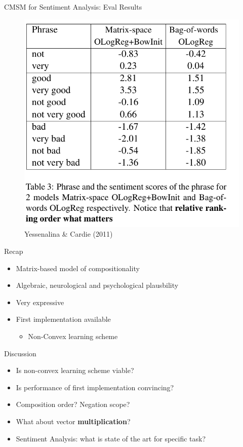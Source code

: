 \documentclass[12pt,a4paper]{beamer}
\begin{document}
\begin{frame}{CMSM for Sentiment Analysis: Eval Results}
\begin{figure}
\includegraphics[scale=0.45]{cmsm_for_se_table3.png}
\caption{Yessenalina \&  Cardie (2011)}
\end{figure}

\end{frame}


\begin{frame}{Recap}
\begin{itemize}
\item Matrix-based model of compositionality
\item Algebraic, neurological and psychological plausbility
\item Very expressive
\item First implementation available
    \begin{itemize}
    \item Non-Convex learning scheme
    \end{itemize}
\end{itemize}
\end{frame}

\begin{frame}{Discussion}
\begin{itemize}
\item Is non-convex learning scheme viable?
\item Is performance of first implementation convincing?
\item Composition order? Negation scope? \cite{cmsmse} 
\item What about vector \textbf{multiplication}?
\item Sentiment Analysis: what is state of the art for specific task?
\end{itemize}
\end{frame}
\end{document}
